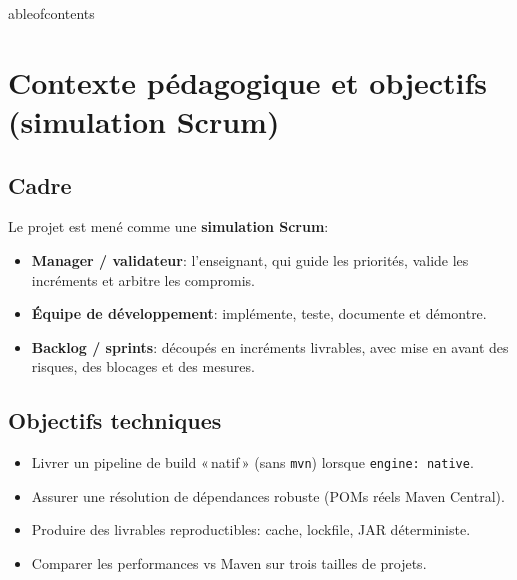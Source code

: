\documentclass[11pt,a4paper]{article}
\author{Équipe projet (go-jpm)}
\date{26 décembre 2025}
\begin{document}
\maketitle

\begin{abstract}
Ce rapport académique (cours \textit{Gestion de Projet}) présente une simulation de gestion de projet en méthode Scrum, avec l’enseignant jouant le rôle de manager (et, selon la dynamique pédagogique, assimilé aux rôles de \textit{Product Owner} et de validation). Le livrable technique est l’implantation d’un moteur de build «\,natif\,» pour le CLI JPM, implémenté en Go, capable de résoudre des dépendances Maven, de télécharger les artefacts, de compiler avec \texttt{javac} et de générer un JAR déterministe --- sans appeler Maven dans le mode natif. Le document synthétise l’architecture, les décisions, les sprints, les blocages rencontrés sur des POMs réels, les correctifs, et une campagne de benchmarks comparatifs vs Maven.
\end{abstract}

	ableofcontents
\newpage

\section{Contexte pédagogique et objectifs (simulation Scrum)}
\subsection{Cadre}
Le projet est mené comme une \textbf{simulation Scrum}:
\begin{itemize}
  \item \textbf{Manager / validateur}: l’enseignant, qui guide les priorités, valide les incréments et arbitre les compromis.
  \item \textbf{Équipe de développement}: implémente, teste, documente et démontre.
  \item \textbf{Backlog / sprints}: découpés en incréments livrables, avec mise en avant des risques, des blocages et des mesures.
\end{itemize}

\subsection{Objectifs techniques}
\begin{itemize}
  \item Livrer un pipeline de build «\,natif\,» (sans \texttt{mvn}) lorsque \texttt{engine: native}.
  \item Assurer une résolution de dépendances robuste (POMs réels Maven Central).
  \item Produire des livrables reproductibles: cache, lockfile, JAR déterministe.
  \item Comparer les performances vs Maven sur trois tailles de projets.
\end{itemize}
\end{document}
